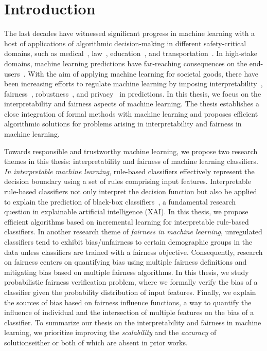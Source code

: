 \chapter{Introduction}
The last decades have witnessed significant progress in machine learning with a host of applications of algorithmic decision-making in different safety-critical domains, such as medical~\cite{erickson2017machine,kaissis2020secure,kononenko2001machine}, law~\cite{kumar2018law,surden2014machine}, education~\cite{luckin2018machine}, and transportation~\cite{peled2019model,zantalis2019review}. In high-stake domains,  machine learning predictions have far-reaching consequences on the end-users~\cite{eshete2021making}. With the aim of applying machine learning for societal goods, there have been increasing efforts to regulate machine learning by imposing interpretability~\cite{rudin2019stop}, fairness~\cite{barocas2017fairness}, robustness~\cite{rauber2017foolbox}, and privacy~\cite{papernot2016towards} in predictions. In this thesis, we focus on the interpretability and fairness aspects of machine learning. The thesis establishes a close integration of formal methods with machine learning and proposes efficient algorithmic solutions for problems arising in interpretability and fairness in machine learning.

Towards responsible and trustworthy machine learning, we propose two research themes in this thesis: interpretability and fairness of machine learning classifiers. \emph{In interpretable machine learning}, rule-based classifiers effectively represent the decision boundary using a set of rules comprising input features. Interpretable rule-based classifiers not only interpret the decision function but also be applied to explain the prediction of black-box classifiers~\cite{gill2020responsible,lundberg2017unified,moradi2021post,ribeiro2016should,slack2020fooling}, a fundamental research question in explainable artificial intelligence (XAI). In this thesis, we propose efficient algorithms based on incremental learning for interpretable rule-based classifiers. In another research theme of \emph{fairness in machine learning}, unregulated classifiers tend to exhibit bias/unfairness to certain demographic groups in the data unless classifiers are trained with a fairness objective. Consequently, research on fairness centers on quantifying bias using multiple fairness definitions and mitigating bias based on multiple fairness algorithms. In this thesis, we study probabilistic fairness verification problem, where we formally verify the bias of a classifier given the probability distribution of input features. Finally, we explain the sources of bias based on fairness influence functions, a way to quantify the influence of individual and the intersection of multiple features on the bias of a classifier. To summarize our thesis on the interpretability and fairness in machine learning, we prioritize improving the \emph{scalability} and the \emph{accuracy} of solutions\textemdash either or both of which are absent in prior works. 




